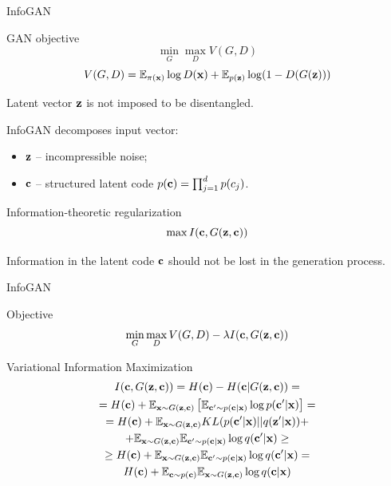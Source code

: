 \begin{frame}{InfoGAN}
	\begin{block}{GAN objective}
		\vspace{-0.6cm}
		\[
		\min_{G} \max_D V(G, D)
		\]
		\[
		V(G, D)  =  \mathbb{E}_{\pi(\mathbf{x})} \log D(\mathbf{x}) + \mathbb{E}_{p(\mathbf{z})} \log (1 - D(G(\mathbf{z})))
		\]
	\end{block}
	Latent vector $\mathbf{z}$ is not imposed to be disentangled.
	
	InfoGAN decomposes input vector:
	\begin{itemize}
		\item $\mathbf{z}$ -- incompressible noise;
		\item $\mathbf{c}$ -- structured latent code $p(\mathbf{c}) = \prod_{j=1}^d p(c_j)$.
	\end{itemize}
	\begin{block}{Information-theoretic regularization}
		\vspace{-0.3cm}
		\[
			\max I (\mathbf{c}, G(\mathbf{z}, \mathbf{c}))
		\]
	\end{block}
	Information in the latent code $\mathbf{c}$ should not be lost in the generation process.
\end{frame}
\begin{frame}{InfoGAN}
	\begin{block}{Objective}
		\vspace{-0.3cm}
		\[
		\min_{G} \max_D V(G, D) - \lambda I (\mathbf{c}, G(\mathbf{z}, \mathbf{c}))
		\]
	\end{block}
	\begin{block}{Variational Information Maximization}
		\vspace{-0.3cm}
		\begin{multline*}
		I (\mathbf{c}, G(\mathbf{z}, \mathbf{c})) = H(\mathbf{c}) - H(\mathbf{c} | G(\mathbf{z}, \mathbf{c})) = \\
		= H(\mathbf{c}) + \mathbb{E}_{\mathbf{x} \sim G(\mathbf{z}, \mathbf{c})} \left[ \mathbb{E}_{\mathbf{c}' \sim p(\mathbf{c} | \mathbf{x})} \log p(\mathbf{c}' | \mathbf{x}) \right] = \\ 
		= H(\mathbf{c}) + \mathbb{E}_{\mathbf{x} \sim G(\mathbf{z}, \mathbf{c})} KL(p(\mathbf{c}'| \mathbf{x}) || q(\mathbf{z}' | \mathbf{x})) + 
		\\ + \mathbb{E}_{\mathbf{x} \sim G(\mathbf{z}, \mathbf{c})}  \mathbb{E}_{\mathbf{c}' \sim p(\mathbf{c} | \mathbf{x})} \log q(\mathbf{c}' | \mathbf{x})  \geq\\
		 \geq H(\mathbf{c}) + \mathbb{E}_{\mathbf{x} \sim G(\mathbf{z}, \mathbf{c})} \mathbb{E}_{\mathbf{c}' \sim p(\mathbf{c} | \mathbf{x})} \log q(\mathbf{c}' | \mathbf{x}) = \\
		 H(\mathbf{c}) + \mathbb{E}_{\mathbf{c} \sim p(\mathbf{c})} \mathbb{E}_{\mathbf{x} \sim G(\mathbf{z}, \mathbf{c})} \log q(\mathbf{c} | \mathbf{x})
		\end{multline*}
	\end{block}
\end{frame}
